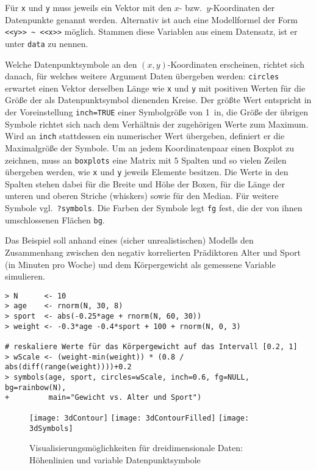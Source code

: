 Für \lstinline!x! und \lstinline!y! muss jeweils ein Vektor mit den $x$- bzw.\ $y$-Koordinaten der Datenpunkte genannt werden. Alternativ ist auch eine Modellformel der Form \lstinline!<<y>> ~ <<x>>! möglich. Stammen diese Variablen aus einem Datensatz, ist er unter \lstinline!data! zu nennen.

Welche Datenpunktsymbole an den $(x,y)$-Koordinaten erscheinen, richtet sich danach, für welches weitere Argument Daten übergeben werden: \lstinline!circles! erwartet einen Vektor derselben Länge wie \lstinline!x! und \lstinline!y! mit positiven Werten für die Größe der als Datenpunktsymbol dienenden Kreise. Der größte Wert entspricht in der Voreinstellung \lstinline!inch=TRUE! einer Symbolgröße von 1~in, die Größe der übrigen Symbole richtet sich nach dem Verhältnis der zugehörigen Werte zum Maximum. Wird an \lstinline!inch! stattdessen ein numerischer Wert übergeben, definiert er die Maximalgröße der Symbole. Um an jedem Koordinatenpaar einen Boxplot zu zeichnen, muss an \lstinline!boxplots! eine Matrix mit $5$ Spalten und so vielen Zeilen übergeben werden, wie \lstinline!x! und \lstinline!y! jeweils Elemente besitzen. Die Werte in den Spalten stehen dabei für die Breite und Höhe der Boxen, für die Länge der unteren und oberen Striche (whiskers) sowie für den Median. Für weitere Symbole vgl.\ \lstinline!?symbols!. Die Farben der Symbole legt \lstinline!fg! fest, die der von ihnen umschlossenen Flächen \lstinline!bg!.

Das Beispiel soll anhand eines (sicher unrealistischen) Modells den Zusammenhang zwischen den negativ korrelierten Prädiktoren Alter und Sport (in Minuten pro Woche) und dem Körpergewicht als gemessene Variable simulieren.
\begin{lstlisting}
> N      <- 10
> age    <- rnorm(N, 30, 8)
> sport  <- abs(-0.25*age + rnorm(N, 60, 30))
> weight <- -0.3*age -0.4*sport + 100 + rnorm(N, 0, 3)

# reskaliere Werte für das Körpergewicht auf das Intervall [0.2, 1]
> wScale <- (weight-min(weight)) * (0.8 / abs(diff(range(weight))))+0.2
> symbols(age, sport, circles=wScale, inch=0.6, fg=NULL, bg=rainbow(N),
+         main="Gewicht vs. Alter und Sport")

\end{lstlisting}

\begin{figure}[ht]
\centering

\texttt{[image: 3dContour]}
\texttt{[image: 3dContourFilled]}
\texttt{[image: 3dSymbols]}
\vspace*{-1em}
\caption{Visualisierungsmöglichkeiten für dreidimensionale Daten: Höhenlinien und variable Datenpunktsymbole}
\label{fig:3dOne}
\end{figure}

